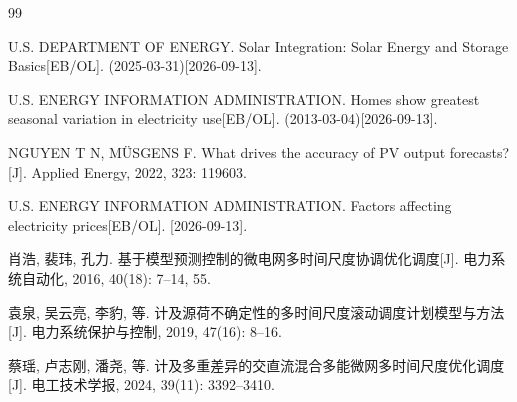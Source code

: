\begin{thebibliography}{99}
  \raggedright

  U.S. DEPARTMENT OF ENERGY.
  Solar Integration: Solar Energy and Storage Basics[EB/OL].
  (2025-03-31)[2026-09-13].

  U.S. ENERGY INFORMATION ADMINISTRATION.
  Homes show greatest seasonal variation in electricity use[EB/OL].
  (2013-03-04)[2026-09-13].

  NGUYEN T N, M\"USGENS F.
  What drives the accuracy of PV output forecasts?[J].
  Applied Energy, 2022, 323: 119603.

  U.S. ENERGY INFORMATION ADMINISTRATION.
  Factors affecting electricity prices[EB/OL].
  [2026-09-13].

  肖浩, 裴玮, 孔力.
  基于模型预测控制的微电网多时间尺度协调优化调度[J].
  电力系统自动化, 2016, 40(18): 7--14, 55.

  袁泉, 吴云亮, 李豹, 等.
  计及源荷不确定性的多时间尺度滚动调度计划模型与方法[J].
  电力系统保护与控制, 2019, 47(16): 8--16.

  蔡瑶, 卢志刚, 潘尧, 等.
  计及多重差异的交直流混合多能微网多时间尺度优化调度[J].
  电工技术学报, 2024, 39(11): 3392--3410.

\end{thebibliography}